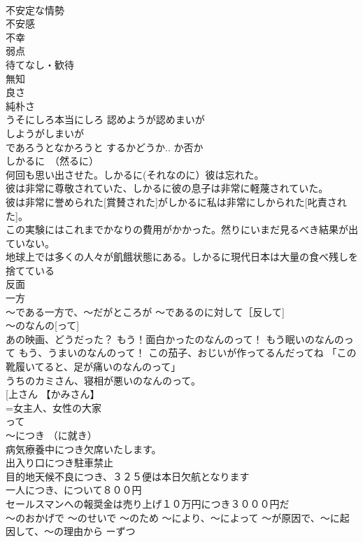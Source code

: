 \documentclass[8pt]{extreport}
\begin{document}
\begin{CJK}{UTF8}{min}
\\	不安定な情勢
\\	不安感
\\	不幸
\\	弱点 
\\	待てなし・歓待
\\	無知 
\\	良さ 
\\	純朴さ
\\	うそにしろ本当にしろ 認めようが認めまいが 
\\	しようがしまいが 
\\	であろうとなかろうと するかどうか.. か否か
\\	しかるに　（然るに）	
\\	何回も思い出させた。しかるに(それなのに）彼は忘れた。 
\\	彼は非常に尊敬されていた、しかるに彼の息子は非常に軽蔑されていた。 
\\	彼は非常に誉められた[賞賛された]がしかるに私は非常にしかられた[叱責された]。 
\\	この実験にはこれまでかなりの費用がかかった。然りにいまだ見るべき結果が出ていない。 
\\	地球上では多くの人々が飢餓状態にある。しかるに現代日本は大量の食べ残しを捨てている 
\\	反面 
\\	一方 
\\	～である一方で、～だがところが ～であるのに対して［反して]
\\	～のなんの[って]	
\\	あの映画、どうだった？ もう！面白かったのなんのって！ もう眠いのなんのって もう、うまいのなんのって！ この茄子、おじいが作ってるんだってね 「この靴履いてると、足が痛いのなんのって」 
\\	うちのカミさん、寝相が悪いのなんのって。
\\	[上さん 【かみさん】 
\\	=女主人、女性の大家	
\\	って 
\\	～につき （に就き） 
\\	病気療養中につき欠席いたします。 
\\	出入り口につき駐車禁止 
\\	目的地天候不良につき、３２５便は本日欠航となります 
\\	一人につき、について８００円 
\\	セールスマンへの報奨金は売り上げ１０万円につき３０００円だ 
\\	～のおかげで ～のせいで ～のため ～により、～によって ～が原因で、～に起因して、～の理由から ーずつ

\end{CJK}
\end{document}

